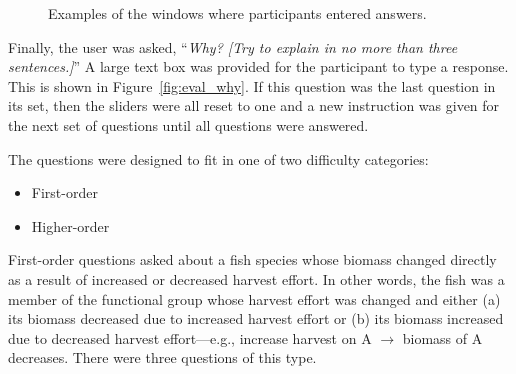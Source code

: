 \begin{figure}
\centering


	\caption{Examples of the windows where participants entered answers.}
	\label{fig:eval}
\end{figure}




Finally, the user was asked, ``\textit{Why? [Try to explain in no more than three sentences.]}''  A large text box was provided for the participant to type a response.  This is shown in Figure~\ref{fig:eval_why}. If this question was the last question in its set, then the sliders were all reset to one and a new instruction was given for the next set of questions until all questions were answered. 


The questions were designed to fit in one of two difficulty categories:
\begin{itemize}
\item First-order
\item Higher-order
\end{itemize}

First-order questions asked about a fish species whose biomass changed directly as a result of increased or decreased harvest effort.  In other words, the fish was a member of the functional group whose harvest effort was changed and either (a) its biomass decreased due to increased harvest effort or (b) its biomass increased due to decreased harvest effort---e.g.,  increase harvest on A $\rightarrow$ biomass of A decreases.  There were three questions of this type.

